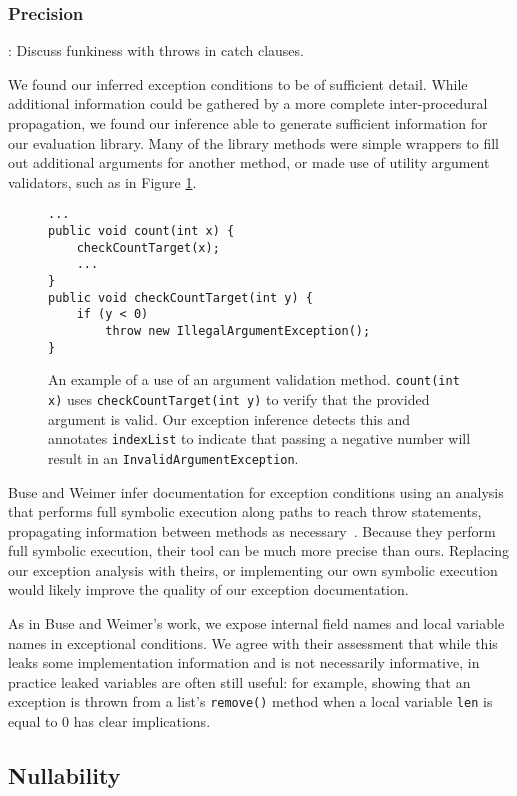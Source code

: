 \subsubsection{Precision}
{\LARGE: Discuss funkiness with throws in catch clauses.}

We found our inferred exception conditions to be of sufficient detail.  While
additional information could be gathered by a more complete inter-procedural
propagation, we found our inference able to generate sufficient information for
our evaluation library.  Many of the library methods were simple wrappers to
fill out additional arguments for another method, or made use of utility
argument validators, such as in Figure \ref{fig:argvalidate}.

\begin{figure}
\begin{verbatim}
...
public void count(int x) {
    checkCountTarget(x);
    ...
}
public void checkCountTarget(int y) {
    if (y < 0)
        throw new IllegalArgumentException();
}
\end{verbatim}
\caption{An example of a use of an argument validation method.
\texttt{count(int x)} uses \texttt{checkCountTarget(int y)} to verify that the
provided argument is valid.  Our exception inference detects this and annotates
\texttt{indexList} to indicate that passing a negative number will result in an
\texttt{InvalidArgumentException}.}
\label{fig:argvalidate}
\end{figure}

Buse and Weimer infer documentation for exception conditions
using an analysis that performs full symbolic execution along paths to reach throw
statements, propagating information between methods as necessary~\cite{autodoc}.
Because they
perform full symbolic execution, their tool can be much more precise than ours.
Replacing our exception analysis with theirs, or implementing our own symbolic
execution would likely improve the quality of our exception documentation.  

As in Buse and Weimer's work, we expose internal field names and
local variable names in exceptional conditions.  We agree with their assessment
that while this leaks some
implementation information and is not necessarily informative, in practice
leaked variables are often still useful: for example, showing that an exception is
thrown from a list's \texttt{remove()} method when a local variable \texttt{len}
is equal to 0 has clear implications.

\subsection{Nullability}
\label{sec:Nullability}

